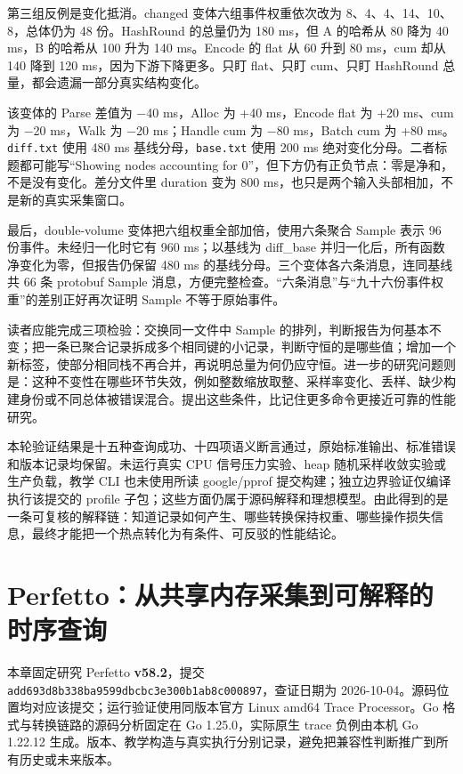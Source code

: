 \documentclass[UTF8,fontset=fandol,openany,11pt]{ctexbook}
\begin{document}
第三组反例是变化抵消。changed 变体六组事件权重依次改为 8、4、4、14、10、8，总体仍为 48 份。HashRound 的总量仍为 180 ms，但 A 的哈希从 80 降为 40 ms，B 的哈希从 100 升为 140 ms。Encode 的 flat 从 60 升到 80 ms，cum 却从 140 降到 120 ms，因为下游下降更多。只盯 flat、只盯 cum、只盯 HashRound 总量，都会遗漏一部分真实结构变化。\cite{pp-teaching}


该变体的 Parse 差值为 −40 ms，Alloc 为 +40 ms，Encode flat 为 +20 ms、cum 为 −20 ms，Walk 为 −20 ms；Handle cum 为 −80 ms，Batch cum 为 +80 ms。\texttt{diff.\allowbreak{}txt} 使用 480 ms 基线分母，\texttt{base.\allowbreak{}txt} 使用 200 ms 绝对变化分母。二者标题都可能写“Showing nodes accounting for 0”，但下方仍有正负节点：零是净和，不是没有变化。差分文件里 duration 变为 800 ms，也只是两个输入头部相加，不是新的真实采集窗口。\cite{pp-total}\cite{pp-merge}\cite{pp-teaching}


最后，double-volume 变体把六组权重全部加倍，使用六条聚合 Sample 表示 96 份事件。未经归一化时它有 960 ms；以基线为 diff\_\allowbreak{}base 并归一化后，所有函数净变化为零，但报告仍保留 480 ms 的基线分母。三个变体各六条消息，连同基线共 66 条 protobuf Sample 消息，方便完整检查。“六条消息”与“九十六份事件权重”的差别正好再次证明 Sample 不等于原始事件。\cite{pp-teaching}


读者应能完成三项检验：交换同一文件中 Sample 的排列，判断报告为何基本不变；把一条已聚合记录拆成多个相同键的小记录，判断守恒的是哪些值；增加一个新标签，使部分相同栈不再合并，再说明总量为何仍应守恒。进一步的研究问题则是：这种不变性在哪些环节失效，例如整数缩放取整、采样率变化、丢样、缺少构建身份或不同总体被错误混合。提出这些条件，比记住更多命令更接近可靠的性能研究。\cite{pp-proto}\cite{pp-merge}\cite{pp-scale}


本轮验证结果是十五种查询成功、十四项语义断言通过，原始标准输出、标准错误和版本记录均保留。未运行真实 CPU 信号压力实验、heap 随机采样收敛实验或生产负载，教学 CLI 也未使用所读 google/pprof 提交构建；独立边界验证仅编译执行该提交的 profile 子包；这些方面仍属于源码解释和理想模型。由此得到的是一条可复核的解释链：知道记录如何产生、哪些转换保持权重、哪些操作损失信息，最终才能把一个热点转化为有条件、可反驳的性能结论。\cite{pp-teaching}


\chapter{Perfetto：从共享内存采集到可解释的时序查询}
\label{ch:20}

本章固定研究 Perfetto \textbf{v58.2}，提交 \texttt{add693d8\allowbreak{}b338ba95\allowbreak{}99dbcbc3\allowbreak{}e300b1ab\allowbreak{}8c000897}，查证日期为 2026-10-04。源码位置均对应该提交；运行验证使用同版本官方 Linux amd64 Trace Processor。Go 格式与转换链路的源码分析固定在 Go 1.25.0，实际原生 trace 负例由本机 Go 1.22.12 生成。版本、教学构造与真实执行分别记录，避免把兼容性判断推广到所有历史或未来版本。\cite{pf-release}\cite{pf-go-main}\cite{pf-validation}
\end{document}
